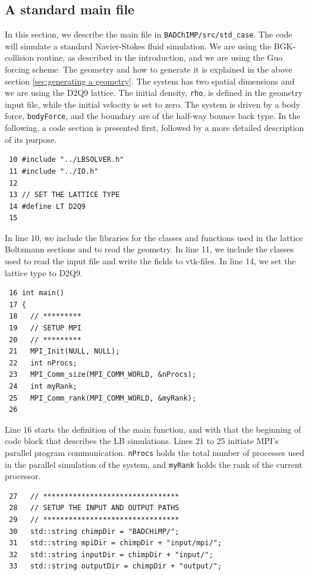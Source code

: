 \documentclass[11pt,a4paper]{report}
\begin{document}
\subsection{A standard main file}
\label{sec:a standard main file}
In this section, we describe the main file in \texttt{BADChIMP/src/std\_case}. The code will simulate a standard Navier-Stokes fluid simulation. We are using the BGK-collision routine, as described in the introduction, and we are using the Guo forcing scheme. The geometry and how to generate it is explained in the above section \ref{sec:generating a geometry}. The system has two spatial dimensions and we are using the D2Q9 lattice. The initial density, \texttt{rho}, is defined in the geometry input file, while the initial velocity is set to zero. The system is driven by a body force, \texttt{bodyForce}, and the boundary are of the half-way bounce back type. In the following, a code section is presented first, followed by a more detailed description of its purpose. 
\begin{verbatim}
 10 #include "../LBSOLVER.h"
 11 #include "../IO.h"
 12
 13 // SET THE LATTICE TYPE
 14 #define LT D2Q9
 15
\end{verbatim} 
In line 10, we include the libraries for the classes and functions used in the lattice Boltzmann sections and to read the geometry. In line 11, we include the classes used to read the input file and write the fields to vtk-files. In line 14, we set the lattice type to D2Q9. 
\begin{verbatim}
 16 int main()
 17 {
 18   // *********
 19   // SETUP MPI
 20   // *********
 21   MPI_Init(NULL, NULL);
 22   int nProcs;
 23   MPI_Comm_size(MPI_COMM_WORLD, &nProcs);
 24   int myRank;
 25   MPI_Comm_rank(MPI_COMM_WORLD, &myRank);
 26
\end{verbatim}
Line 16 starts the definition of the main function, and with that the beginning of code block that describes the LB simulations. Lines 21 to 25 initiate MPI's parallel program communication. \texttt{nProcs} holds the total number of processes used in the parallel simulation of the system, and \texttt{myRank} holds the rank of the current processor.
\begin{verbatim}
 27   // ********************************
 28   // SETUP THE INPUT AND OUTPUT PATHS
 29   // ********************************
 30   std::string chimpDir = "BADCHiMP/";
 31   std::string mpiDir = chimpDir + "input/mpi/";
 32   std::string inputDir = chimpDir + "input/";
 33   std::string outputDir = chimpDir + "output/";
\end{verbatim}
\end{document}
